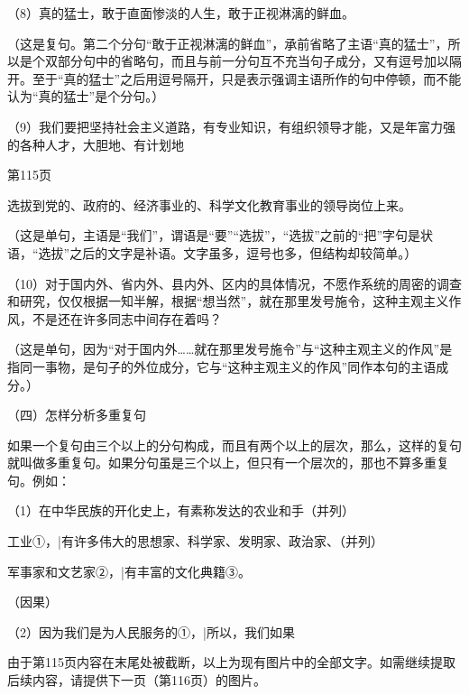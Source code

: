 （8）真的猛士，敢于直面惨淡的人生，敢于正视淋漓的鲜血。

（这是复句。第二个分句“敢于正视淋漓的鲜血”，承前省略了主语“真的猛士”，所以是个双部分句中的省略句，而且与前一分句互不充当句子成分，又有逗号加以隔开。至于“真的猛士”之后用逗号隔开，只是表示强调主语所作的句中停顿，而不能认为“真的猛士”是个分句。）

（9）我们要把坚持社会主义道路，有专业知识，有组织领导才能，又是年富力强的各种人才，大胆地、有计划地

第115页

选拔到党的、政府的、经济事业的、科学文化教育事业的领导岗位上来。

（这是单句，主语是“我们”，谓语是“要”“选拔”，“选拔”之前的“把”字句是状语，“选拔”之后的文字是补语。文字虽多，逗号也多，但结构却较简单。）

（10）对于国内外、省内外、县内外、区内的具体情况，不愿作系统的周密的调查和研究，仅仅根据一知半解，根据“想当然”，就在那里发号施令，这种主观主义作风，不是还在许多同志中间存在着吗？

（这是单句，因为“对于国内外……就在那里发号施令”与“这种主观主义的作风”是指同一事物，是句子的外位成分，它与“这种主观主义的作风”同作本句的主语成分。）

（四）怎样分析多重复句

如果一个复句由三个以上的分句构成，而且有两个以上的层次，那么，这样的复句就叫做多重复句。如果分句虽是三个以上，但只有一个层次的，那也不算多重复句。例如：

（1）在中华民族的开化史上，有素称发达的农业和手（并列）

工业①，|有许多伟大的思想家、科学家、发明家、政治家、（并列）

军事家和文艺家②，|有丰富的文化典籍③。

（因果）

（2）因为我们是为人民服务的①，|所以，我们如果

由于第115页内容在末尾处被截断，以上为现有图片中的全部文字。如需继续提取后续内容，请提供下一页（第116页）的图片。